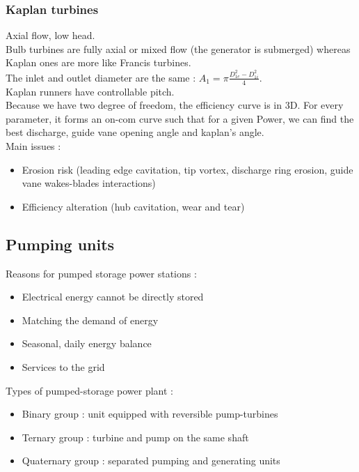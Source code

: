 \documentclass[../main.tex]{subfiles}
\begin{document}
\subsubsection{Kaplan turbines}
Axial flow, low head.\\
Bulb turbines are fully axial or mixed flow (the generator is submerged) whereas Kaplan ones are more like Francis turbines.\\
The inlet and outlet diameter are the same : $A_1 = \pi \frac{D_{1e}^2 - D_{1i}^2}{4}$.\\

Kaplan runners have controllable pitch. \\

Because we have two degree of freedom, the efficiency curve is in 3D. For every parameter, it forms an on-com curve such that for a given Power, we can find the best discharge, guide vane opening angle and kaplan's angle. \\

Main issues : \begin{itemize}
    \item Erosion risk (leading edge cavitation, tip vortex, discharge ring erosion, guide vane wakes-blades interactions)
    \item Efficiency alteration (hub cavitation, wear and tear)
\end{itemize}

\subsection{Pumping units}
Reasons for pumped storage power stations : \begin{itemize}
    \item Electrical energy cannot be directly stored
    \item Matching the demand of energy
    \item Seasonal, daily energy balance
    \item Services to the grid
\end{itemize}

Types of pumped-storage power plant : \begin{itemize}
    \item Binary group : unit equipped with reversible pump-turbines
    \item Ternary group : turbine and pump on the same shaft
    \item Quaternary group : separated pumping and generating units
\end{itemize}
\end{document}
